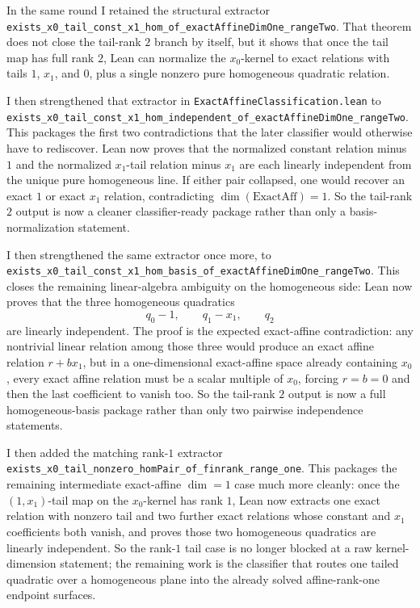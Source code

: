 \documentclass[11pt]{article}
\begin{document}
In the same round I retained the structural extractor
\texttt{exists\_x0\_tail\_const\_x1\_hom\_of\_exactAffineDimOne\_rangeTwo}.
That theorem does not close the tail-rank \(2\) branch by itself, but it shows
that once the tail map has full rank \(2\), Lean can normalize the
\(x_0\)-kernel to exact relations with tails \(1\), \(x_1\), and \(0\), plus a
single nonzero pure homogeneous quadratic relation.

I then strengthened that extractor in
\texttt{ExactAffineClassification.lean} to
\texttt{exists\_x0\_tail\_const\_x1\_hom\_independent\_of\_exactAffineDimOne\_rangeTwo}.
This packages the first two contradictions that the later classifier would
otherwise have to rediscover. Lean now proves that the normalized constant
relation minus \(1\) and the normalized \(x_1\)-tail relation minus \(x_1\)
are each linearly independent from the unique pure homogeneous line. If either
pair collapsed, one would recover an exact \(1\) or exact \(x_1\) relation,
contradicting \(\dim(\mathrm{ExactAff})=1\). So the tail-rank \(2\) output is
now a cleaner classifier-ready package rather than only a basis-normalization
statement.

I then strengthened the same extractor once more, to
\texttt{exists\_x0\_tail\_const\_x1\_hom\_basis\_of\_exactAffineDimOne\_rangeTwo}.
This closes the remaining linear-algebra ambiguity on the homogeneous side:
Lean now proves that the three homogeneous quadratics
\[
  q_0-1,\qquad q_1-x_1,\qquad q_2
\]
are linearly independent. The proof is the expected exact-affine contradiction:
any nontrivial linear relation among those three would produce an exact affine
relation \(r+b x_1\), but in a one-dimensional exact-affine space already
containing \(x_0\), every exact affine relation must be a scalar multiple of
\(x_0\), forcing \(r=b=0\) and then the last coefficient to vanish too. So the
tail-rank \(2\) output is now a full homogeneous-basis package rather than only
two pairwise independence statements.

I then added the matching rank-\(1\) extractor
\texttt{exists\_x0\_tail\_nonzero\_homPair\_of\_finrank\_range\_one}. This
packages the remaining intermediate exact-affine \(\dim=1\) case much more
cleanly: once the \((1,x_1)\)-tail map on the \(x_0\)-kernel has rank \(1\),
Lean now extracts one exact relation with nonzero tail and two further exact
relations whose constant and \(x_1\) coefficients both vanish, and proves those
two homogeneous quadratics are linearly independent. So the rank-\(1\) tail
case is no longer blocked at a raw kernel-dimension statement; the remaining
work is the classifier that routes one tailed quadratic over a homogeneous
plane into the already solved affine-rank-one endpoint surfaces.
\end{document}
